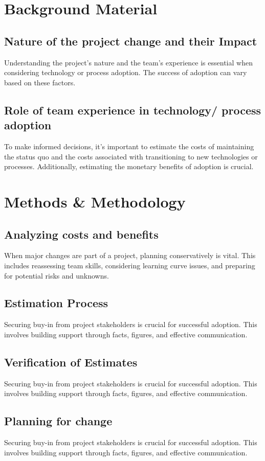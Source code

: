 \documentclass{article}
\begin{document}
\section{Background Material}
\subsection{Nature of the project change and their Impact}
Understanding the project's nature and the team's experience is essential when considering technology or process adoption. The success of adoption can vary based on these factors.
\subsection{Role of team experience in technology/ process adoption}
To make informed decisions, it's important to estimate the costs of maintaining the status quo and the costs associated with transitioning to new technologies or processes. Additionally, estimating the monetary benefits of adoption is crucial.

\section{Methods \& Methodology}
\subsection{Analyzing costs and benefits}
When major changes are part of a project, planning conservatively is vital. This includes reassessing team skills, considering learning curve issues, and preparing for potential risks and unknowns.
\subsection{Estimation Process}
Securing buy-in from project stakeholders is crucial for successful adoption. This involves building support through facts, figures, and effective communication.
\subsection{Verification of Estimates}
Securing buy-in from project stakeholders is crucial for successful adoption. This involves building support through facts, figures, and effective communication.
\subsection{Planning for change}
Securing buy-in from project stakeholders is crucial for successful adoption. This involves building support through facts, figures, and effective communication.
\end{document}
